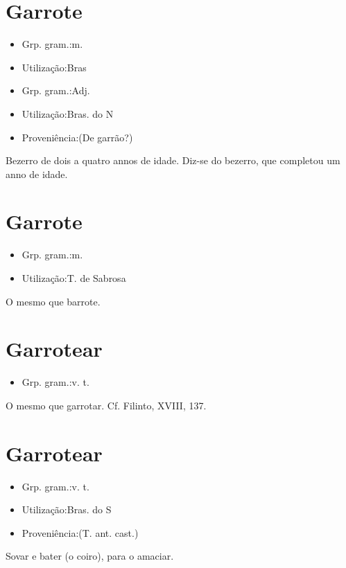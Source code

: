 \section{Garrote}
\begin{itemize}
\item {Grp. gram.:m.}
\end{itemize}
\begin{itemize}
\item {Utilização:Bras}
\end{itemize}
\begin{itemize}
\item {Grp. gram.:Adj.}
\end{itemize}
\begin{itemize}
\item {Utilização:Bras. do N}
\end{itemize}
\begin{itemize}
\item {Proveniência:(De \textunderscore garrão\textunderscore ?)}
\end{itemize}
Bezerro de dois a quatro annos de idade.
Diz-se do bezerro, que completou um anno de idade.
\section{Garrote}
\begin{itemize}
\item {Grp. gram.:m.}
\end{itemize}
\begin{itemize}
\item {Utilização:T. de Sabrosa}
\end{itemize}
O mesmo que \textunderscore barrote\textunderscore .
\section{Garrotear}
\begin{itemize}
\item {Grp. gram.:v. t.}
\end{itemize}
O mesmo que \textunderscore garrotar\textunderscore . Cf. Filinto, XVIII, 137.
\section{Garrotear}
\begin{itemize}
\item {Grp. gram.:v. t.}
\end{itemize}
\begin{itemize}
\item {Utilização:Bras. do S}
\end{itemize}
\begin{itemize}
\item {Proveniência:(T. ant. cast.)}
\end{itemize}
Sovar e bater (o coiro), para o amaciar.
